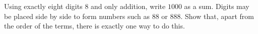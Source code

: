 Using exactly eight digits $8$ and only addition, write $1000$ as a sum. Digits may be placed side by side to form numbers such as $88$ or $888$. Show that, apart from the order of the terms, there is exactly one way to do this.

